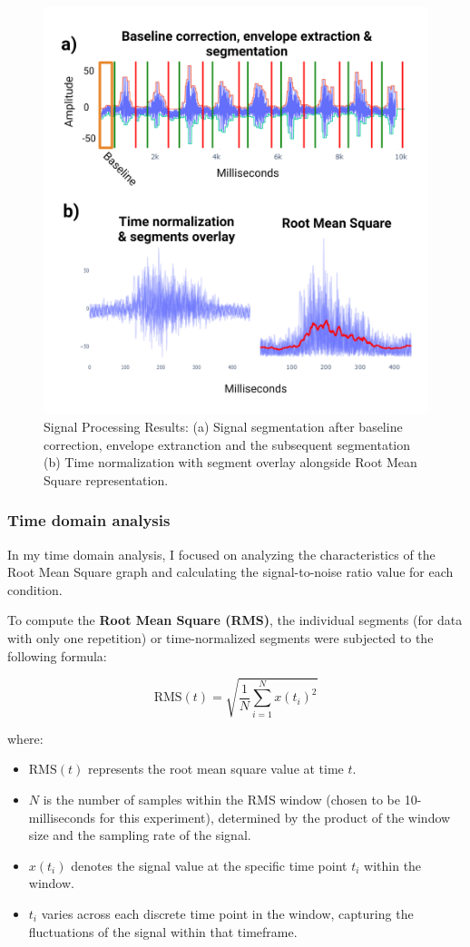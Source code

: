 \documentclass[conference]{IEEEtran}
\begin{document}
\begin{figure}[h]
   \centering
   \includegraphics[width=1\linewidth]{baselinecorrection.png}
   \caption{Signal Processing Results: (a) Signal segmentation after baseline correction, envelope extranction and the subsequent segmentation 
   (b) Time normalization with segment overlay alongside Root Mean Square representation.}
   \label{fig:baselinecorrection}
\end{figure}

\subsubsection{Time domain analysis}
In my time domain analysis, I focused on analyzing the characteristics of the Root Mean Square graph and calculating the signal-to-noise ratio value for each condition.

To compute the \textbf{Root Mean Square (RMS)}, the individual segments (for data with only one repetition) or time-normalized segments were subjected to the following formula:

\[
\text{RMS}(t) = \sqrt{\frac{1}{N} \sum_{i=1}^{N} x(t_i)^2}
\]

where:
\begin{itemize}
    \item \( \text{RMS}(t) \) represents the root mean square value at time \( t \).
    \item \( N \) is the number of samples within the RMS window (chosen to be 10-milliseconds for this experiment), determined by the product of the window size and the sampling rate of the signal.
    \item \( x(t_i) \) denotes the signal value at the specific time point \( t_i \) within the window.
    \item \( t_i \) varies across each discrete time point in the window, capturing the fluctuations of the signal within that timeframe.
\end{itemize}
\end{document}
